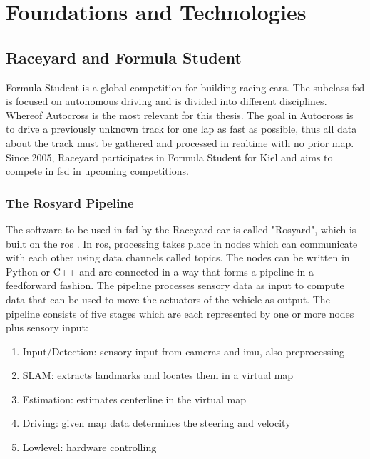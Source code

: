 

\graphicspath{{Chapter/Figs/FoundationsAndTechnologies/}}
\chapter{Foundations and Technologies}

\section{Raceyard and Formula Student}
Formula Student is a global competition for building racing cars. The subclass \ac{fsd} is focused on autonomous driving and is divided into different disciplines. Whereof Autocross is the most relevant for this thesis. The goal in Autocross is to drive a previously unknown track for one lap as fast as possible, thus all data about the track must be gathered and processed in realtime with no prior map.
Since 2005, Raceyard participates in Formula Student for Kiel and aims to compete in \ac{fsd} in upcoming competitions.


\subsection{The Rosyard Pipeline}
The software to be used in \ac{fsd} by the Raceyard car is called "Rosyard", which is built on the \ac{ros} \cite{ros}.
In \ac{ros}, processing takes place in nodes which can communicate with each other using data channels called topics. The nodes can be written in Python or C++ and are connected in a way that forms a pipeline in a feedforward fashion. The pipeline processes sensory data as input to compute data that can be used to move the actuators of the vehicle as output. The pipeline consists of five stages which are each represented by one or more nodes plus sensory input:
\begin{enumerate}
    \item Input/Detection: sensory input from cameras and \ac{imu}, also preprocessing
    \item SLAM: extracts landmarks and locates them in a virtual map
    \item Estimation: estimates centerline in the virtual map
    \item Driving: given map data determines the steering and velocity
    \item Lowlevel: hardware controlling
\end{enumerate}

